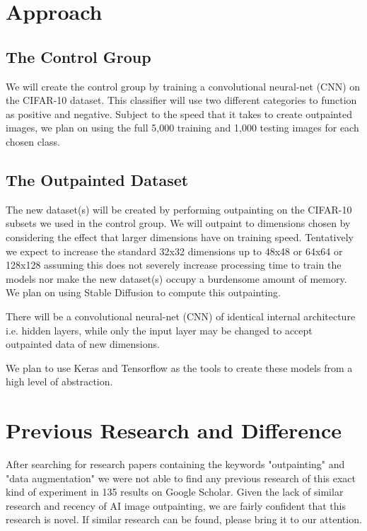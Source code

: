 \documentclass[12pt, letterpaper]{article}
\begin{document}
\section{Approach}

\subsection{The Control Group}

We will create the control group by training a convolutional neural-net (CNN) on the CIFAR-10 dataset. This classifier will use two different categories to function as positive and negative. Subject to the speed that it takes to create outpainted images, we plan on using the full 5,000 training and 1,000 testing images for each chosen class.

\subsection{The Outpainted Dataset}

The new dataset(s) will be created by performing outpainting on the CIFAR-10 subsets we used in the control group. We will outpaint to dimensions chosen by considering the effect that larger dimensions have on training speed. Tentatively we expect to increase the standard 32x32 dimensions up to 48x48 or 64x64 or 128x128 assuming this does not severely increase processing time to train the models nor make the new dataset(s) occupy a burdensome amount of memory. We plan on using Stable Diffusion to compute this outpainting.

There will be a convolutional neural-net (CNN) of identical internal architecture i.e. hidden layers, while only the input layer may be changed to accept outpainted data of new dimensions.

We plan to use Keras and Tensorflow as the tools to create these models from a high level of abstraction.

\section{Previous Research and Difference}

After searching for research papers containing the keywords "outpainting" and "data augmentation" we were not able to find any previous research of this exact kind of experiment in 135 results on Google Scholar. Given the lack of similar research and recency of AI image outpainting, we are fairly confident that this research is novel. If similar research can be found, please bring it to our attention.
\end{document}
